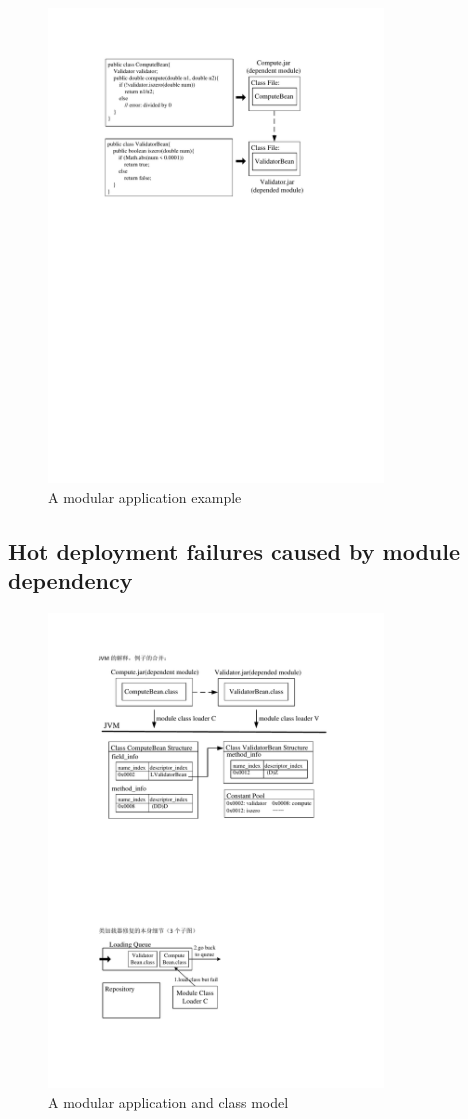 \documentclass[conference]{IEEEtran}
\begin{document}
\begin{figure}[ht]
\centering
\includegraphics[width=3.5in]{ExampleEJB.pdf}
\caption{A modular application example}
\label{fig:example}
\end{figure}


\subsection{Hot deployment failures caused by module dependency}

\begin{figure}[ht]
\centering
\includegraphics[width=3.5in]{ExampleJVM.pdf}
\caption{A modular application and class model}
\label{fig:example_jvm}
\end{figure}
\end{document}

